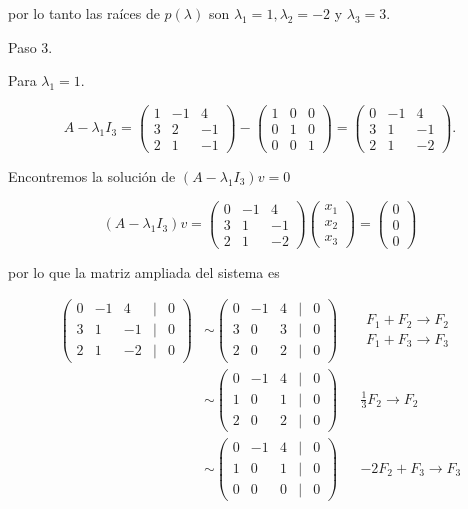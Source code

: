 \documentclass[compacto,10pt]{pubciencias-notas}
\begin{document}
\begin{ejem}
por lo tanto las raíces de $p(\lambda)$ son $\lambda_{1}=1,\lambda_{2}=-2$ y $\lambda_{3}=3$.


Paso 3.

Para $\lambda_{1}=1$.

\[
A-\lambda_{1}I_{3}=\begin{pmatrix}
1&-1&4 \\ 3&2&-1 \\ 2&1&-1 \end{pmatrix} -\begin{pmatrix}
1&0&0 \\ 0&1&0 \\ 0&0&1 \end{pmatrix}=\begin{pmatrix}
0&-1&4 \\ 3&1&-1 \\ 2&1&-2 \end{pmatrix}.
\]

Encontremos la solución de $(A-\lambda_{1}I_{3})v=0$

\[
(A-\lambda_{1}I_{3})v= \begin{pmatrix}
0&-1&4 \\ 3&1&-1 \\ 2&1&-2 \end{pmatrix}\begin{pmatrix} x_{1}\\ x_{2}\\ x_{3}\end{pmatrix}=\begin{pmatrix} 0\\ 0\\ 0\end{pmatrix}
\]

por lo que la matriz ampliada del sistema es


\begin{align*}
\begin{pmatrix}0 & -1 & 4 & | & 0\\ 3 & 1 & -1 & | & 0\\ 2 & 1 & -2 & | & 0\end{pmatrix}
& \sim 
\begin{pmatrix}0 & -1 & 4 & | & 0\\ 3 & 0 & 3 & | & 0\\ 2 & 0 & 2 & | & 0\end{pmatrix}
&& \begin{array}{c}
    F_1+F_2\rightarrow F_2\\
    F_1+F_3\rightarrow F_3
\end{array}\\
& \sim 
\begin{pmatrix}0 & -1 & 4 & | & 0\\ 1 & 0 & 1 & | & 0\\ 2 & 0 & 2 & | & 0\end{pmatrix}
&& \frac{1}{3}F_2\rightarrow F_2\\
& \sim 
\begin{pmatrix}0 & -1 & 4 & | & 0\\ 1 & 0 & 1 & | & 0\\ 0 & 0 & 0 & | & 0\end{pmatrix}
&& -2F_2+F_3\rightarrow F_3
\end{align*}


\end{ejem}
\end{document}
